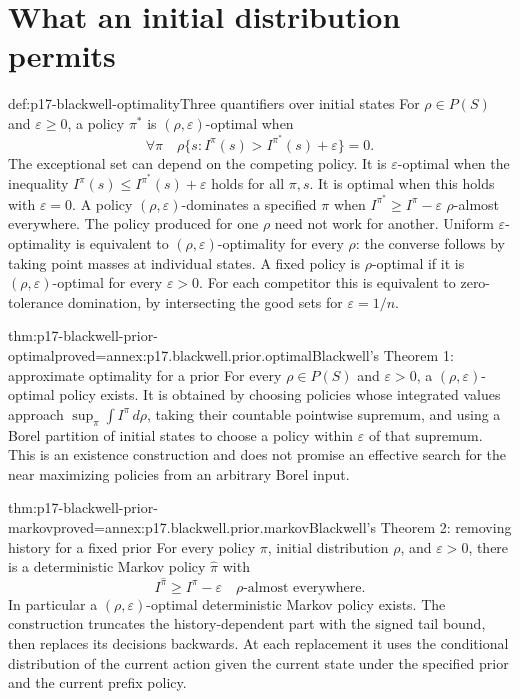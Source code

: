 \section{What an initial distribution permits}

\begin{hbdefinition}{def:p17-blackwell-optimality}{Three quantifiers over initial states}
For \(\rho\in P(S)\) and \(\varepsilon\geq0\), a policy \(\pi^*\) is
\((\rho,\varepsilon)\)-optimal when
\[
 \forall\pi\quad
 \rho\{s:I^\pi(s)>I^{\pi^*}(s)+\varepsilon\}=0.
\]
The exceptional set can depend on the competing policy.
It is \(\varepsilon\)-optimal when the inequality
\(I^\pi(s)\leq I^{\pi^*}(s)+\varepsilon\) holds for all
\(\pi,s\). It is optimal when this holds with \(\varepsilon=0\).
A policy \((\rho,\varepsilon)\)-dominates a specified \(\pi\)
when \(I^{\pi^*}\geq I^\pi-\varepsilon\) \(\rho\)-almost everywhere.
The policy produced for one \(\rho\) need not work for another.
Uniform \(\varepsilon\)-optimality is equivalent to
\((\rho,\varepsilon)\)-optimality for every \(\rho\):
the converse follows by taking point masses at individual states.
A fixed policy is \(\rho\)-optimal if it is
\((\rho,\varepsilon)\)-optimal for every \(\varepsilon>0\).
For each competitor this is equivalent to zero-tolerance domination,
by intersecting the good sets for \(\varepsilon=1/n\).
\end{hbdefinition}

\begin{hbtheorem}{thm:p17-blackwell-prior-optimal}{proved=annex:p17.blackwell.prior.optimal}{Blackwell's Theorem 1: approximate optimality for a prior}
For every \(\rho\in P(S)\) and \(\varepsilon>0\), a
\((\rho,\varepsilon)\)-optimal policy exists.
It is obtained by choosing policies whose integrated values approach
\(\sup_\pi\int I^\pi\,d\rho\), taking their countable pointwise
supremum, and using a Borel partition of initial states to choose
a policy within \(\varepsilon\) of that supremum.
This is an existence construction and does not promise an effective
search for the near maximizing policies from an arbitrary Borel input.
\end{hbtheorem}

\begin{hbtheorem}{thm:p17-blackwell-prior-markov}{proved=annex:p17.blackwell.prior.markov}{Blackwell's Theorem 2: removing history for a fixed prior}
For every policy \(\pi\), initial distribution \(\rho\), and
\(\varepsilon>0\), there is a deterministic Markov policy
\(\widehat\pi\) with
\[
             I^{\widehat\pi}\geq I^\pi-\varepsilon
                       \quad\rho\text{-almost everywhere}.
\]
In particular a \((\rho,\varepsilon)\)-optimal deterministic
Markov policy exists. The construction truncates the history-dependent
part with the signed tail bound, then replaces its decisions backwards.
At each replacement it uses the conditional distribution of the
current action given the current state under the specified prior
and the current prefix policy.
\end{hbtheorem}

